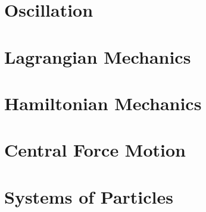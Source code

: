 \section{Oscillation}




\section{Lagrangian Mechanics}




\section{Hamiltonian Mechanics}


\eqn{}


\section{Central Force Motion}



\section{Systems of Particles}



